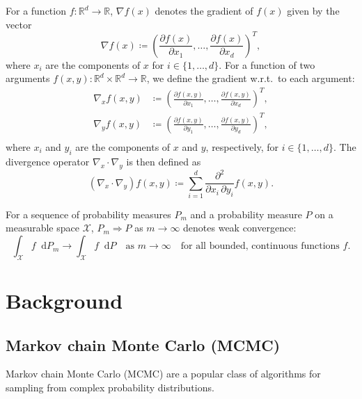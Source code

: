 \documentclass[11pt,a4paper]{report}
\newcommand*\diff{\mathop{}\!\mathrm{d}}
\begin{document}
For a function $f: \mathbb{R}^d \to \mathbb{R}$, $\nabla f(x)$ denotes the gradient of $f(x)$ given by the vector
\begin{equation*}
\nabla f(x) \coloneq \left( \frac{\partial f(x)}{\partial x_1}, \dots, \frac{\partial f(x)}{\partial x_d} \right)^T,
\end{equation*}
where $x_i$ are the components of $x$ for $i \in \{1, \dots, d\}$.
For a function of two arguments $f(x, y): \mathbb{R}^d \times \mathbb{R}^d \to \mathbb{R}$, we define the gradient w.r.t.\ to each argument:
\begin{equation*}
\begin{aligned}
\nabla_x f(x, y) &\coloneq \left(\frac{\partial f(x, y)}{\partial x_1}, \dots, \frac{\partial f(x, y)}{\partial x_d}\right)^T, \\
\nabla_y f(x, y) &\coloneq \left(\frac{\partial f(x, y)}{\partial y_1}, \dots, \frac{\partial f(x, y)}{\partial y_d}\right)^T, \\
\end{aligned}
\end{equation*}
where $x_i$ and $y_i$ are the components of $x$ and $y$, respectively, for $i \in \{1, \dots, d\}$. The divergence operator $\nabla_x \cdot \nabla_y$ is then defined as
\begin{equation*}
(\nabla_x \cdot \nabla_y) f(x,y) \coloneq \sum_{i=1}^d \frac{\partial^2}{\partial x_i\, \partial y_i} f(x, y).
\end{equation*}

For a sequence of probability measures $P_m$ and a probability measure $P$ on a measurable space $\mathcal{X}$, $P_m \Rightarrow P$ as $m \to \infty$ denotes weak convergence:
\begin{equation*}
\int_{\mathcal{X}} f \diff P_m \to \int_{\mathcal{X}} f \diff P \quad \text{as } m \to \infty \quad \text{for all bounded, continuous functions } f.
\end{equation*}


\chapter{Background}
\label{ch:background}

\section{Markov chain Monte Carlo (MCMC)}

Markov chain Monte Carlo (MCMC) are a popular class of algorithms for sampling from complex probability distributions.
\end{document}
